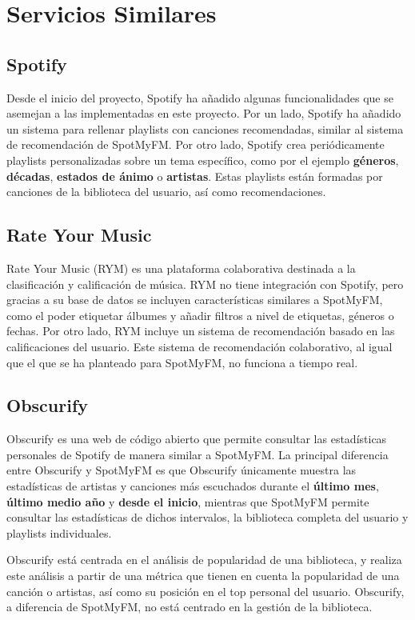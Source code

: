 \section{Servicios Similares}

\subsection{Spotify}
Desde el inicio del proyecto, Spotify \cite{spotify} ha añadido algunas funcionalidades que se asemejan a las implementadas en este proyecto. Por un lado, Spotify ha añadido un sistema para rellenar playlists con canciones recomendadas, similar al sistema de recomendación de SpotMyFM. Por otro lado, Spotify crea periódicamente playlists personalizadas sobre un tema específico, como por el ejemplo \textbf{géneros}, \textbf{décadas}, \textbf{estados de ánimo} o \textbf{artistas}. Estas playlists están formadas por canciones de la biblioteca del usuario, así como recomendaciones.

\subsection{Rate Your Music}
Rate Your Music \cite{RYM} (RYM) es una plataforma colaborativa destinada a la clasificación y calificación de música. RYM no tiene integración con Spotify, pero gracias a su base de datos se incluyen características similares a SpotMyFM, como el poder etiquetar álbumes y añadir filtros a nivel de etiquetas, géneros o fechas. Por otro lado, RYM incluye un sistema de recomendación basado en las calificaciones del usuario. Este sistema de recomendación colaborativo, al igual que el que se ha planteado para SpotMyFM, no funciona a tiempo real.


\subsection{Obscurify}
Obscurify \cite{Obscurif67:online} es una web de código abierto que permite consultar las estadísticas personales de Spotify de manera similar a SpotMyFM. La principal diferencia entre Obscurify y SpotMyFM es que Obscurify únicamente muestra las estadísticas de artistas y canciones más escuchados durante el \textbf{último mes}, \textbf{último medio año} y \textbf{desde el inicio}, mientras que SpotMyFM permite consultar las estadísticas de dichos intervalos, la biblioteca completa del usuario y playlists individuales.

Obscurify está centrada en el análisis de popularidad de una biblioteca, y realiza este análisis a partir de una métrica que tienen en cuenta la popularidad de una canción o artistas, así como su posición en el top personal del usuario. Obscurify, a diferencia de SpotMyFM, no está centrado en la gestión de la biblioteca. 

